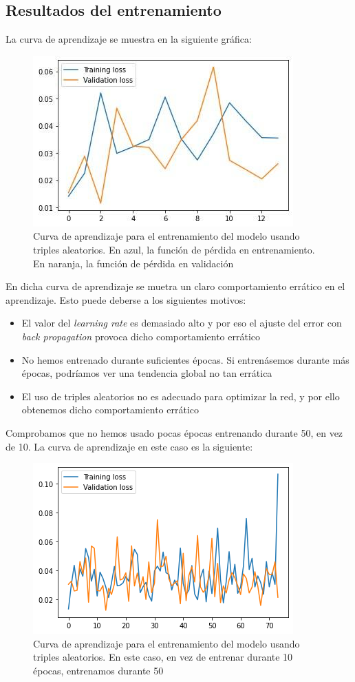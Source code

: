 \documentclass[11pt]{article}
\begin{document}
\pagebreak

\subsection{Resultados del entrenamiento} \label{resultados_entrenamiento:seccion}

La curva de aprendizaje se muestra en la siguiente gráfica:

\begin{figure}[H]
    \centering
    \includegraphics[width = 0.4 \textwidth]{random_curva_aprendizaje}
    \caption{Curva de aprendizaje para el entrenamiento del modelo usando triples aleatorios. En azul, la función de pérdida en entrenamiento. En naranja, la función de pérdida en validación}
\end{figure}

En dicha curva de aprendizaje se muetra un claro comportamiento errático en el aprendizaje. Esto puede deberse a los siguientes motivos:

\begin{itemize}
  \item El valor del \emph{learning rate} es demasiado alto y por eso el ajuste del error con \emph{back propagation} provoca dicho comportamiento errático
  \item No hemos entrenado durante suficientes épocas. Si entrenásemos durante más épocas, podríamos ver una tendencia global no tan errática
  \item El uso de triples aleatorios no es adecuado para optimizar la red, y por ello obtenemos dicho comportamiento errático
\end{itemize}

Comprobamos que no hemos usado pocas épocas entrenando durante 50, en vez de 10. La curva de aprendizaje en este caso es la siguiente:

\begin{figure}[H]
    \centering
    \includegraphics[width = 0.4 \textwidth]{random_curva_aprendizaje_larga}
    \caption{Curva de aprendizaje para el entrenamiento del modelo usando triples aleatorios. En este caso, en vez de entrenar durante 10 épocas, entrenamos durante 50}
\end{figure}
\end{document}
